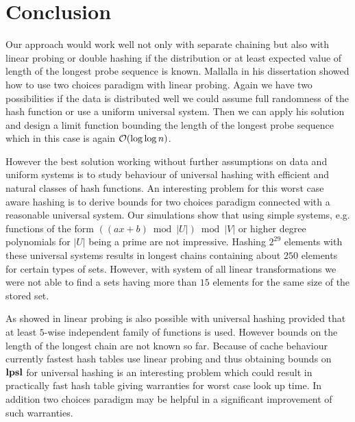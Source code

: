 \section{Conclusion}
\label{section-conclusion}
Our approach would work well not only with separate chaining but also with linear probing or double hashing if the distribution or at least expected value of length of the longest probe sequence is known. Mallalla in his dissertation \cite{Malalla:2004:THS:1124034} showed how to use two choices paradigm with linear probing. Again we have two possibilities if the data is distributed well we could assume full randomness of the hash function or use a uniform universal system. Then we can apply his solution and design a limit function bounding the length of the longest probe sequence which in this case is again $\mathcal{O}(\log \log n)$.

However the best solution working without further assumptions on data and uniform systems is to study behaviour of universal hashing with efficient and natural classes of hash functions. An interesting  problem for this worst case aware hashing is to derive bounds for two choices paradigm connected with a reasonable universal system. Our simulations show that using simple systems, e.g. functions of the form $((ax + b) \bmod |U|) \bmod |V|$ or higher degree polynomials for $|U|$ being a prime are not impressive. Hashing $2^{29}$ elements with these universal systems results in longest chains containing about $250$ elements for certain types of sets. However, with system of all linear transformations we were not able to find a sets having more than $15$ elements for the same size of the stored set.

As showed in \cite{DBLP:conf/alenex/ThorupZ10} linear probing is also possible with universal hashing provided that at least $5$-wise independent family of functions is used. However bounds on the length of the longest chain are not known so far. Because of cache behaviour currently fastest hash tables use linear probing and thus obtaining bounds on $\mathbf{lpsl}$ for universal hashing is an interesting problem which could result in practically fast hash table giving warranties for worst case look up time. In addition two choices paradigm may be helpful in a significant improvement of such warranties.